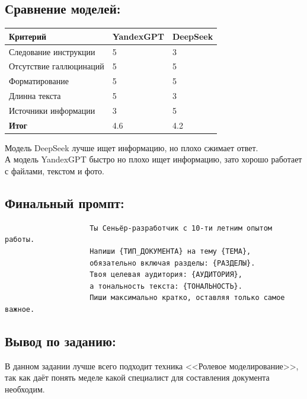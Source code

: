 \subsection{Сравнение моделей:}
\begin{table}[h!]
	\centering
	\begin{tabular}{|l|p{5cm}|p{5cm}|}
		\hline
		\textbf{Критерий} & \textbf{YandexGPT} & \textbf{DeepSeek} \\
		\hline
		Следование инструкции & 5 & 3 \\
		\hline
		Отсутствие галлюцинаций & 5 & 5 \\
		\hline
		Форматирование & 5 & 5 \\
		\hline
		Длинна текста & 5 & 3 \\
		\hline
		Источники информации & 3 & 5 \\
		\hline
		\textbf{Итог} & 4.6 & 4.2 \\
		\hline
	\end{tabular}
\end{table}
Модель DeepSeek лучше ищет информацию, но плохо сжимает ответ. \\
А модель YandexGPT быстро но плохо ищет информацию, зато хорошо работает с файлами, текстом и фото. \\
\subsection{Финальный промпт:}
\begin{verbatim}
					Ты Сеньёр-разработчик с 10-ти летним опытом работы.
					Напиши {ТИП_ДОКУМЕНТА} на тему {ТЕМА},
					обязательно включая разделы: {РАЗДЕЛЫ}.
					Твоя целевая аудитория: {АУДИТОРИЯ},
					а тональность текста: {ТОНАЛЬНОСТЬ}.
					Пиши максимально кратко, оставляя только самое важное.
\end{verbatim}
\subsection{Вывод по заданию:}
\indent В данном задании лучше всего подходит техника <<Ролевое моделирование>>, так как даёт понять меделе какой специалист для составления документа необходим.
	